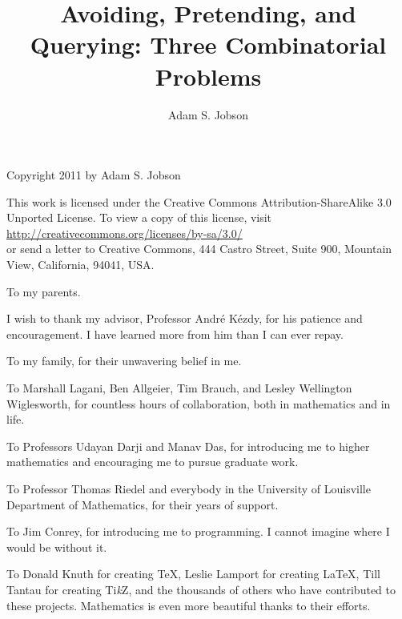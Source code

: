 \documentclass{ul-thesis}
\title{Avoiding, Pretending, and Querying: Three Combinatorial Problems}
\author{Adam S. Jobson}
\begin{document}
\frontmatter
\maketitle

\begin{copyrightinfo}%
	Copyright 2011 by Adam S. Jobson


	This work is licensed under the Creative Commons Attribution-ShareAlike 3.0 Unported License. To view a copy of this license, visit 
\\\url{http://creativecommons.org/licenses/by-sa/3.0/}\\ or send a letter to Creative Commons, 444 Castro Street, Suite 900, Mountain View, California, 94041, USA.
\end{copyrightinfo}

\signaturepage

\begin{dedication}
	To my parents.
\end{dedication}

\begin{acknowledgements}
	I wish to thank my advisor, Professor Andr\'e K\'ezdy, for his patience and encouragement. I have learned more from him than I can ever repay.

	To my family, for their unwavering belief in me.

	To Marshall Lagani, Ben Allgeier, Tim Brauch, and Lesley Wellington Wiglesworth, for countless hours of collaboration, both in mathematics and in life.

	To Professors Udayan Darji and Manav Das, for introducing me to higher mathematics and encouraging me to pursue graduate work.

	To Professor Thomas Riedel and everybody in the University of Louisville Department of Mathematics, for their years of support. 

	To Jim Conrey, for introducing me to programming. I cannot imagine where I would be without it.

	To Donald Knuth for creating \TeX, Leslie Lamport for creating \LaTeX, Till Tantau for creating Ti\emph{k}Z, and the thousands of others who have contributed to these projects. Mathematics is even more beautiful thanks to their efforts.
\end{acknowledgements}
\end{document}
